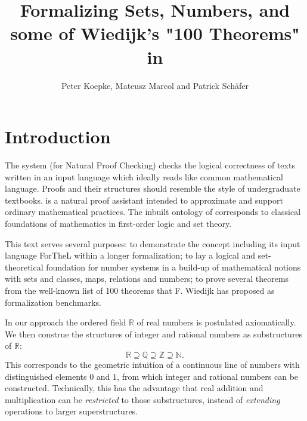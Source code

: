 \documentclass{article}
\begin{document}

\newcommand{\Prod}[3]{#1_{#2} \cdots #1_{#3}}
\newcommand{\Seq}[2]{\{#1,\dots,#2\}}
\newcommand{\FinSet}[3]{\{#1_{#2},\dots,#1_{#3}\}}
\newcommand{\Primes}{\mathbb{P}}
\newcommand{\pow}{{\cal P}}
\newcommand{\range}{\operatorname{ran}}
\newcommand{\inv}[1]{#1^{-1}}
\newcommand{\sset}[2]{\{#1\}_{#2}}

\title{Formalizing Sets, Numbers, and some of Wiedijk's
"100 Theorems" in \Naproche{}}

\author{Peter Koepke, Mateusz Marcol and Patrick Schäfer}

\maketitle

\tableofcontents
\newpage

\section{Introduction}

The \Naproche{} system (for Natural Proof Checking)
checks the logical correctness of texts
written in an input language which ideally reads
like common mathematical language. Proofs and their 
structures should resemble the
style of undergraduate textbooks. 
\Naproche is a natural proof assistant intended to
approximate and support ordinary mathematical practices.
The inbuilt ontology of \Naproche{} corresponds to classical foundations
of mathematics in first-order logic and set theory.

This text serves several purposes: to demonstrate the 
\Naproche{} concept including its
input language ForTheL within a longer formalization;
to lay a logical and set-theoretical foundation for
number systems in a build-up of mathematical notions
with sets and classes, maps, relations and numbers;
to prove several theorems from the well-known list of 100 theorems
that F. Wiedijk has proposed as formalization benchmarks.
 
In our approach the ordered field $\mathbb{R}$ of real numbers
is postulated axiomatically. We then construe the structures of integer and
rational numbers as substructures of $\mathbb{R}$:
\[ \mathbb{R} \supseteq \mathbb{Q} \supseteq \mathbb{Z}
\supseteq \mathbb{N}. \]
This corresponds to the 
geometric intuition of a continuous line of numbers with
distinguished elements $0$ and $1$, from which integer and rational numbers can
be constructed. Technically, this has the advantage 
that real addition and multiplication
can be {\em restricted} to those substructures, instead of {\em extending} operations
to larger superstructures.
\end{document}
